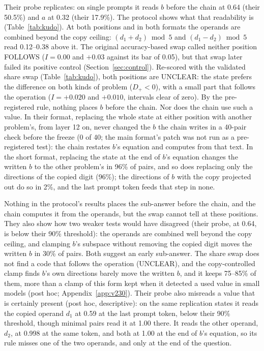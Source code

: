 \documentclass{article}
\begin{document}
Their probe replicates: on single prompts it reads $b$ before the chain at 0.64 (their 50.5\%) and $a$ at 0.32 (their 17.9\%). The protocol shows what that readability is (Table~\ref{tab:kudo}). At both positions and in both formats the operands are combined beyond the copy ceiling: $(d_1+d_2) \bmod 5$ and $(d_1-d_2) \bmod 5$ read 0.12--0.38 above it. The original accuracy-based swap called neither position FOLLOWS ($I = 0.00$ and $+0.03$ against its bar of 0.05), but that swap later failed its positive control (Section~\ref{sec:control}). Re-scored with the validated share swap (Table~\ref{tab:kudo}), both positions are UNCLEAR: the state prefers the difference on both kinds of problem ($D_+ < 0$), with a small part that follows the operation ($I = +0.020$ and $+0.010$, intervals clear of zero). By the pre-registered rule, nothing places $b$ before the chain. Nor does the chain use such a value. In their format, replacing the whole state at either position with another problem's, from layer 12 on, never changed the $b$ the chain writes in a 40-pair check before the freeze (0 of 40; the main format's patch was not run as a pre-registered test): the chain restates $b$'s equation and computes from that text. In the short format, replacing the state at the end of $b$'s equation changes the written $b$ to the other problem's in 96\% of pairs, and so does replacing only the directions of the copied digit (96\%); the directions of $b$ with the copy projected out do so in 2\%, and the last prompt token feeds that step in none.

Nothing in the protocol's results places the sub-answer before the chain, and the chain computes it from the operands, but the swap cannot tell at these positions. They also show how two weaker tests would have disagreed (their probe, at 0.64, is below their 90\% threshold): the operands are combined well beyond the copy ceiling, and clamping $b$'s subspace without removing the copied digit moves the written $b$ in 30\% of pairs. Both suggest an early sub-answer. The share swap does not find a code that follows the operation (UNCLEAR), and the copy-controlled clamp finds $b$'s own directions barely move the written $b$, and it keeps 75--85\% of them, more than a clamp of this form kept when it detected a used value in small models (post hoc; Appendix~\ref{app:v230}). Their probe also misreads a value that is certainly present (post hoc, descriptive): on the same replication states it reads the copied operand $d_1$ at 0.59 at the last prompt token, below their 90\% threshold, though minimal pairs read it at 1.00 there. It reads the other operand, $d_2$, at 0.998 at the same token, and both at 1.00 at the end of $b$'s equation, so its rule misses one of the two operands, and only at the end of the question.
\end{document}
